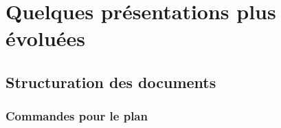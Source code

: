 \documentclass{report}
\begin{document}
\section{Quelques présentations plus évoluées}
\subsection{Structuration des documents}
\subsubsection{Commandes pour le plan}







\end{document}
